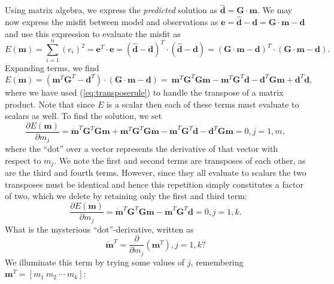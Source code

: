 Using matrix algebra, we express the \emph{predicted} solution as $\hat{\mathbf{d}} = \mathbf{G \cdot m}$.
We may now express the misfit
between model and observations as $\mathbf{e} = \hat{\mathbf{d}} - \mathbf{d} = \mathbf{G \cdot m} - \mathbf{d}$
and use this expression to evaluate the misfit as
\begin{equation}
E(\mathbf{m}) = \sum ^n _{i=1}  (e_i)^2  = \mathbf{e}^T \cdot \mathbf{e} = \left(\hat{\mathbf{d}} - \mathbf{d}\right)^T\cdot \left(\hat{\mathbf{d}} - \mathbf{d}\right) = \left(\mathbf{G \cdot m} - \mathbf{d}\right)^T \cdot \left(\mathbf{G \cdot m} - \mathbf{d}\right).
\end{equation}
Expanding terms, we find
\begin{equation}
E(\mathbf{m}) =  \left(\mathbf{m}^T\mathbf{G}^T - \mathbf{d}^T\right) \cdot \left(\mathbf{G \cdot m} - \mathbf{d}\right) = \
\mathbf{m}^T\mathbf{G}^T\mathbf{Gm} - \mathbf{m}^T\mathbf{G}^T\mathbf{d} - \mathbf{d}^T\mathbf{Gm} + \mathbf{d}^T\mathbf{d},
\end{equation}
where we have used (\ref{eq:transposerule}) to handle the transpose of a matrix product.
Note that since $E$ is a scalar then each of these terms must evaluate to scalars as well.  To find the solution, we set
\begin{equation}
\frac{\partial E(\mathbf{m})}{\partial m_j} = \mathbf{\dot{m}}^T\mathbf{G}^T\mathbf{Gm} + \mathbf{m}^T\mathbf{G}^T\mathbf{G\dot{m}} - \mathbf{\dot{m}}^T\mathbf{G}^T\mathbf{d} - \mathbf{d}^T\mathbf{G\dot{m}} = 0, j = 1,m,
\end{equation}
where the ``dot'' over a vector represents the derivative of that vector with respect to $m_j$.
We note the first and second terms are transposes of each other, as are the third and fourth terms.
However, since they all evaluate to scalars the two transposes must be identical and hence this
repetition simply constitutes a factor of two, which we delete by retaining only the first and third term:
\begin{equation}
\frac{\partial E(\mathbf{m})}{\partial m_j} = \mathbf{\dot{m}}^T\mathbf{G}^T\mathbf{Gm} - \mathbf{\dot{m}}^T\mathbf{G}^T\mathbf{d} = 0, j = 1,k.
\end{equation}
What is the mysterious ``dot''-derivative, written as
\begin{equation}
\mathbf{\dot{m}}^T = \frac{\partial}{\partial m_j} \left (\mathbf{m}^T \right), j = 1,k?
\end{equation}
We illuminate this term by trying some values of $j$, remembering $\mathbf{m}^T = [m_1\ m_2 \ \cdots \ m_k ]$:
